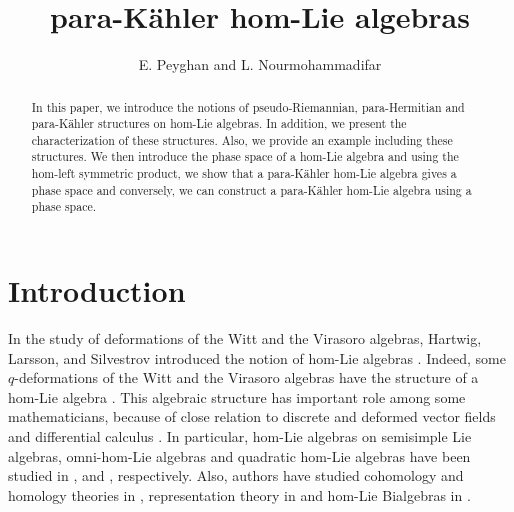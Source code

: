 \documentclass[10pt]{amsart}
\numberwithin{equation}{section}
\begin{document}
\title[ para-K\"{a}hler hom-Lie algebras]
 { para-K\"{a}hler hom-Lie algebras}



\author[Esmaeil Peyghan and Leila Nourmohammadifar]{ E. Peyghan and L. Nourmohammadifar}
\address{Department of Mathematics, Faculty of Science, Arak University,
Arak, 38156-8-8349, Iran.}

 
 



\begin{abstract}
In this paper, we introduce the notions of pseudo-Riemannian, para-Hermitian and para-K\"{a}hler structures on hom-Lie
algebras. In addition, we present  the characterization of these structures. Also, we provide  an example 
including  these structures. We then  introduce the phase space of a hom-Lie algebra and using the hom-left
symmetric product, we show that a para-K\"{a}hler hom-Lie algebra gives a phase space and conversely, we
can construct a para-K\"{a}hler hom-Lie algebra using a phase space.

\end{abstract}

\maketitle

\section{Introduction}
In the study of deformations of the Witt and the Virasoro algebras, Hartwig, Larsson, and Silvestrov introduced the notion of hom-Lie algebras \cite{HLS}. Indeed, some $q$-deformations of the
Witt and the Virasoro algebras have the structure of a hom-Lie algebra \cite{HLS, H}. This algebraic structure has important role among some mathematicians, because of close
relation to discrete and deformed vector fields and differential calculus \cite{HLS, LS}. In particular, hom-Lie algebras on semisimple Lie
algebras, omni-hom-Lie algebras and quadratic hom-Lie algebras have been studied in \cite{JL}, \cite{SX} and \cite{BM}, respectively. Also, authors have studied cohomology and
homology theories in \cite{AEM, CS, Y}, representation theory in \cite{S} and hom-Lie Bialgebras in \cite{Y1}.
\end{document}
